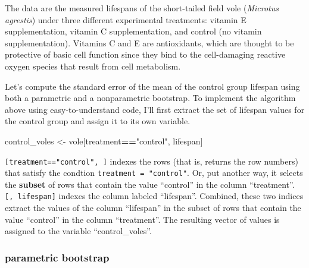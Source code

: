 \documentclass[]{book}
\newenvironment{Shaded}{\begin{snugshade}}{\end{snugshade}}
\newcommand{\NormalTok}[1]{#1}
\newcommand{\OperatorTok}[1]{\textcolor[rgb]{0.81,0.36,0.00}{\textbf{#1}}}
\newcommand{\StringTok}[1]{\textcolor[rgb]{0.31,0.60,0.02}{#1}}
\begin{document}
The data are the measured lifespans of the short-tailed field vole (\emph{Microtus agrestis}) under three different experimental treatments: vitamin E supplementation, vitamin C supplementation, and control (no vitamin supplementation). Vitamins C and E are antioxidants, which are thought to be protective of basic cell function since they bind to the cell-damaging reactive oxygen species that result from cell metabolism.

Let's compute the standard error of the mean of the control group lifespan using both a parametric and a nonparametric bootstrap. To implement the algorithm above using easy-to-understand code, I'll first extract the set of lifespan values for the control group and assign it to its own variable.

\begin{Shaded}
\begin{Highlighting}[]
\NormalTok{control_voles <-}\StringTok{ }\NormalTok{vole[treatment}\OperatorTok{==}\StringTok{"control"}\NormalTok{, lifespan]}
\end{Highlighting}
\end{Shaded}

\texttt{{[}treatment=="control",\ {]}} indexes the rows (that is, returns the row numbers) that satisfy the condtion \texttt{treatment\ =\ "control"}. Or, put another way, it selects the \textbf{subset} of rows that contain the value ``control'' in the column ``treatment''. \texttt{{[},\ lifespan{]}} indexes the column labeled ``lifespan''. Combined, these two indices extract the values of the column ``lifespan'' in the subset of rows that contain the value ``control'' in the column ``treatment''. The resulting vector of values is assigned to the variable ``control\_voles''.

\hypertarget{parametric-bootstrap}{%
\subsubsection{parametric bootstrap}\label{parametric-bootstrap}}
\end{document}
